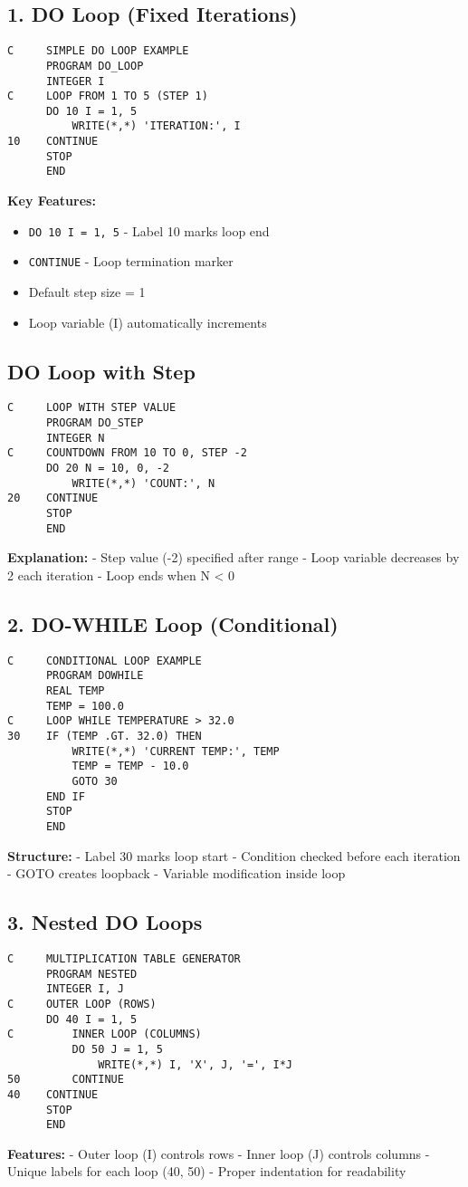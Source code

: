\documentclass{book}
\begin{document}
\subsection*{1. DO Loop (Fixed Iterations)}
\begin{verbatim}
C     SIMPLE DO LOOP EXAMPLE
      PROGRAM DO_LOOP
      INTEGER I
C     LOOP FROM 1 TO 5 (STEP 1)
      DO 10 I = 1, 5
          WRITE(*,*) 'ITERATION:', I
10    CONTINUE
      STOP
      END
\end{verbatim}
\textbf{Key Features:}
\begin{itemize}
\item \texttt{DO 10 I = 1, 5} - Label 10 marks loop end
\item \texttt{CONTINUE} - Loop termination marker
\item Default step size = 1
\item Loop variable (I) automatically increments
\end{itemize}

\subsection*{DO Loop with Step}
\begin{verbatim}
C     LOOP WITH STEP VALUE
      PROGRAM DO_STEP
      INTEGER N
C     COUNTDOWN FROM 10 TO 0, STEP -2
      DO 20 N = 10, 0, -2
          WRITE(*,*) 'COUNT:', N
20    CONTINUE
      STOP
      END
\end{verbatim}
\textbf{Explanation:}
- Step value (-2) specified after range
- Loop variable decreases by 2 each iteration
- Loop ends when N < 0

\subsection*{2. DO-WHILE Loop (Conditional)}
\begin{verbatim}
C     CONDITIONAL LOOP EXAMPLE
      PROGRAM DOWHILE
      REAL TEMP
      TEMP = 100.0
C     LOOP WHILE TEMPERATURE > 32.0
30    IF (TEMP .GT. 32.0) THEN
          WRITE(*,*) 'CURRENT TEMP:', TEMP
          TEMP = TEMP - 10.0
          GOTO 30
      END IF
      STOP
      END
\end{verbatim}
\textbf{Structure:}
- Label 30 marks loop start
- Condition checked before each iteration
- GOTO creates loopback
- Variable modification inside loop

\subsection*{3. Nested DO Loops}
\begin{verbatim}
C     MULTIPLICATION TABLE GENERATOR
      PROGRAM NESTED
      INTEGER I, J
C     OUTER LOOP (ROWS)
      DO 40 I = 1, 5
C         INNER LOOP (COLUMNS)
          DO 50 J = 1, 5
              WRITE(*,*) I, 'X', J, '=', I*J
50        CONTINUE
40    CONTINUE
      STOP
      END
\end{verbatim}
\textbf{Features:}
- Outer loop (I) controls rows
- Inner loop (J) controls columns
- Unique labels for each loop (40, 50)
- Proper indentation for readability
\end{document}
